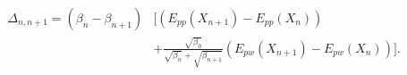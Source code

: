 \begin{center}
    \begin{equation}
        \begin{aligned}
        \Delta_{n,n+1} = (\beta_{n} - \beta_{n+1})& \Big[(E_{pp}(X_{n+1}) - E_{pp}(X_{n})) \\
        &+ \frac{\sqrt{\beta_{0}}} {\sqrt{\beta_{n}}+\sqrt{\beta_{n+1}}} (E_{pw}(X_{n+1}) - E_{pw}(X_{n}))\Big].
        \end{aligned}
        \label{eq:rest2_AR}
    \end{equation}
\end{center}
